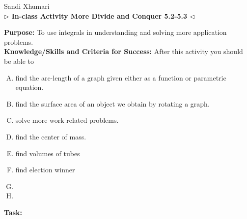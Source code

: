 \documentclass[answers]{exam}
\begin{document}
\begin{center}
	\hfill Sandi Xhumari \\ \textbf{$\triangleright$ In-class Activity More Divide and Conquer 5.2-5.3 $\triangleleft$}\\
\end{center}

\textbf{Purpose:} To use integrals in understanding and solving more application problems.    \\

\textbf{Knowledge/Skills and Criteria for Success:} After this activity you should be able to

\begin{enumerate}[A.]
	\item find the arc-length of a graph given either as a function or parametric equation.
	\item find the surface area of an object we obtain by rotating a graph. 
	\item solve more work related problems.
	\item find the center of mass.
	\item find volumes of tubes
	\item find election winner
	\item 
	\item
	
	
\end{enumerate}

\textbf{Task:} 
\end{document}
